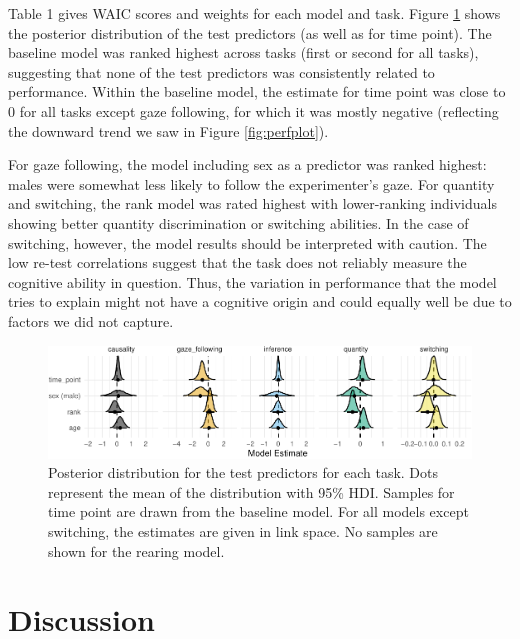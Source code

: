 \documentclass[10pt, letterpaper]{article}
\newenvironment{CodeChunk}{}{}
\begin{document}
Table 1 gives WAIC scores and weights for each model and task. Figure
\ref{fig:predplot} shows the posterior distribution of the test
predictors (as well as for time point). The baseline model was ranked
highest across tasks (first or second for all tasks), suggesting that
none of the test predictors was consistently related to performance.
Within the baseline model, the estimate for time point was close to 0
for all tasks except gaze following, for which it was mostly negative
(reflecting the downward trend we saw in Figure \ref{fig:perfplot}).

For gaze following, the model including sex as a predictor was ranked
highest: males were somewhat less likely to follow the experimenter's
gaze. For quantity and switching, the rank model was rated highest with
lower-ranking individuals showing better quantity discrimination or
switching abilities. In the case of switching, however, the model
results should be interpreted with caution. The low re-test correlations
suggest that the task does not reliably measure the cognitive ability in
question. Thus, the variation in performance that the model tries to
explain might not have a cognitive origin and could equally well be due
to factors we did not capture.

\begin{CodeChunk}
\begin{figure}[h]

{\centering \includegraphics{figs/predplot-1} 

}

\caption[Posterior distribution for the test predictors for each task]{Posterior distribution for the test predictors for each task. Dots represent the mean of the distribution with 95\% HDI. Samples for time point are drawn from the baseline model. For all models except switching, the estimates are given in link space. No samples are shown for the rearing model.}\label{fig:predplot}
\end{figure}
\end{CodeChunk}

\hypertarget{discussion}{%
\section{Discussion}\label{discussion}}
\end{document}
